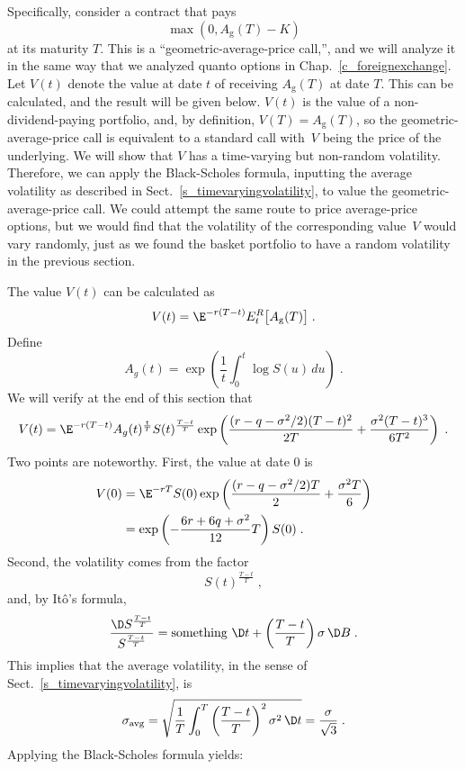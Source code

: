 Specifically, consider a contract that pays
$$\max(0,A_\text{g}(T)-K)$$
at its maturity $T$.
This is a ``geometric-average-price call,'', and we will analyze it in the same way that we analyzed quanto options in Chap.~\ref{c_foreignexchange}.  Let $V(t)$ denote the value at date $t$ of receiving $A_\text{g}(T)$ at date $T$.  This can be calculated, and the result will be given below.  $V(t)$ is the value of a non-dividend-paying portfolio, and, by definition, $V(T)=A_\text{g}(T)$, so the geometric-average-price call is equivalent to a standard call with~$V$ being the price of the underlying.  We will show that $V$ has a time-varying but non-random volatility.  Therefore, we can apply the Black-Scholes formula, inputting the average volatility as described in Sect.~\ref{s_timevaryingvolatility}, to value the geometric-average-price call.  We could attempt the same route to price average-price options, but we would find that the volatility of the corresponding value~$V$ would vary randomly, just as we found the basket portfolio to have a random volatility in the previous section.

The value $V(t)$ can be calculated as
$$V(t)= \E^{-r(T-t)}E^R_t\big[A_\text{g}(T)\big]\; .$$
Define
$$A_g(t) = \exp\left(\frac{1}{t}\int_0^t \log S(u)\,du\right)\; .$$
We will verify at the end of this section that
\begin{equation}\label{geometricaveragev1}
V(t) = \E^{-r(T-t)}A_g(t)^{\frac{t}{T}}S(t)^{\frac{T-t}{T}}\exp\left(\frac{(r-q-\sigma^2/2)(T-t)^2}{2T} + \frac{\sigma^2(T-t)^3}{6T^2}\right)\;.
\end{equation}
Two points are noteworthy.  First, the value at date 0 is
\begin{align}
V(0) &= \E^{-rT}S(0)\exp\left(\frac{(r-q-\sigma^2/2)T}{2} + \frac{\sigma^2T}{6}\right)\notag\\
&=\exp\left(-\frac{6r+6q + \sigma^2}{12}T\right)S(0)\;.\label{asianV0}
\end{align}
Second, the volatility comes from the factor
$$S(t)^{\frac{T-t}{T}}\; ,$$
and, by It\^o's formula,
$$\frac{ \D S^{\frac{T-t}{T}}}{S^{\frac{T-t}{T}}} = \text{something}\,\,\D t + \left(\frac{T-t}{T}\right)\sigma\,\D B\; .$$
This implies that the average volatility, in the sense of Sect.~\ref{s_timevaryingvolatility}, is
$$\sigma_{\text{avg}} = \sqrt{\frac{1}{T}\int_0^T \left(\frac{T-t}{T}\right)^2\sigma^2\,\D t}
=\frac{\sigma}{\sqrt{3}}\; .$$
Applying the Black-Scholes formula yields:

